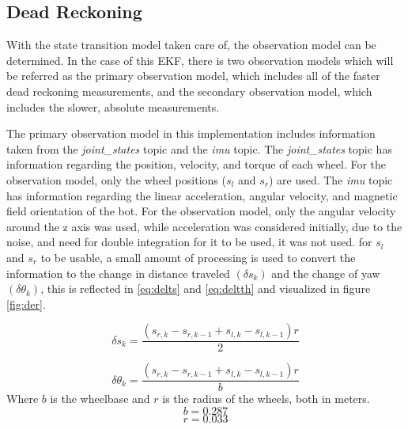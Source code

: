 \subsection{Dead Reckoning}
	With the state transition model taken care of, the observation model can be determined. In the case of this EKF, there is two observation models which will be referred as the primary observation model, which includes all of the faster dead reckoning measurements, and the secondary observation model, which includes the slower, absolute measurements.\par
	The primary observation model in this implementation includes information taken from the \textit{joint\_states} topic and the \textit{imu} topic. The \textit{joint\_states} topic has information regarding the position, velocity, and torque of each wheel. For the observation model, only the wheel positions ($s_{l}$ and $s_{r}$) are used. The \textit{imu} topic has information regarding the linear acceleration, angular velocity, and magnetic field orientation of the bot. For the observation model, only the angular velocity around the z axis was used, while acceleration was considered initially, due to the noise, and need for double integration for it to be used, it was not used. for $s_{l}$ and $s_{r}$ to be usable, a small amount of processing is used to convert the information to the change in distance traveled $\left(\delta s_{k}\right)$ and the change of yaw $\left(\delta \theta_{k}\right)$, this is reflected in \ref{eq:delts} and \ref{eq:deltth} and visualized in figure \ref{fig:der}.\par
	\begin{equation}
	\label{eq:delts}
		\delta s_{k} = \frac{\left(s_{r,k} - s_{r,k-1} + s_{l,k} - s_{l,k-1}\right)r}{2}
	\end{equation}
	
	\begin{equation}
	\label{eq:deltth}
		\delta \theta_{k} = \frac{\left(s_{r,k} - s_{r,k-1} + s_{l,k} - s_{l,k-1}\right)r}{b}
	\end{equation}
	Where $b$ is the wheelbase and $r$ is the radius of the wheels, both in meters.
	\begin{equation}
	\label{eq:b}
		b = 0.287
	\end{equation}
	\begin{equation}
	\label{eq:r}
		r = 0.033
	\end{equation}
	
